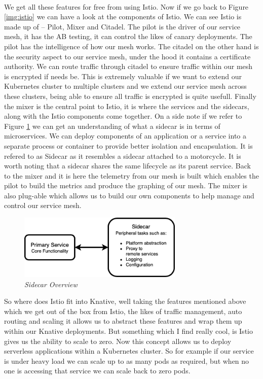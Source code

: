 \\We get all these features for free from using Istio. Now if we go back to Figure \ref{img:istio} we can have a look at the components of Istio. We can see Istio is made up of -- Pilot, Mixer and Citadel. The pilot is the driver of our service mesh, it has the AB testing, it can control the likes of canary deployments. The pilot has the intelligence of how our mesh works. The citadel on the other hand is the security aspect to our service mesh, under the hood it contains a certificate authority. We can route traffic through citadel to ensure traffic within our mesh is encrypted if needs be. This is extremely valuable if we want to extend our Kubernetes cluster to multiple clusters and we extend our service mesh across these clusters, being able to ensure all traffic is encrypted is quite usefull. Finally the mixer is the central point to Istio, it is where the services and the sidecars, along with the Istio components come together. On a side note if we refer to Figure \ref{img:sidecar} we can get an understanding of what a sidecar is in terms of microservices. We can deploy components of an application or a service into a separate process or container to provide better isolation and encapsulation. It is refered to as Sidecar as it resembles a sidecar attached to a motorcycle. It is worth noting that a sidecar shares the same lifecycle as its parent service. Back to the mixer and it is here the telemetry from our mesh is built which enables the pilot to build the metrics and produce the graphing of our mesh. The mixer is also plug-able which allows us to build our own components to help manage and control our service mesh. 

\begin{figure}[!ht]
\centering
\includegraphics*[width=0.7\textwidth]{images/sidecarxml.png}
\caption{\em Sidecar Overview}
\label{img:sidecar}
\end{figure}

So where does Istio fit into Knative, well taking the features mentioned above which we get out of the box from Istio, the likes of traffic management, auto routing and scaling it allows us to abstract these features and wrap them up within our Knative deployments. But something which I find really cool, is Istio gives us the ability to scale to zero. Now this concept allows us to deploy serverless applications within a Kubernetes cluster. So for example if our service is under heavy load we can scale up to as many pods as required, but when no one is accessing that service we can scale back to zero pods.